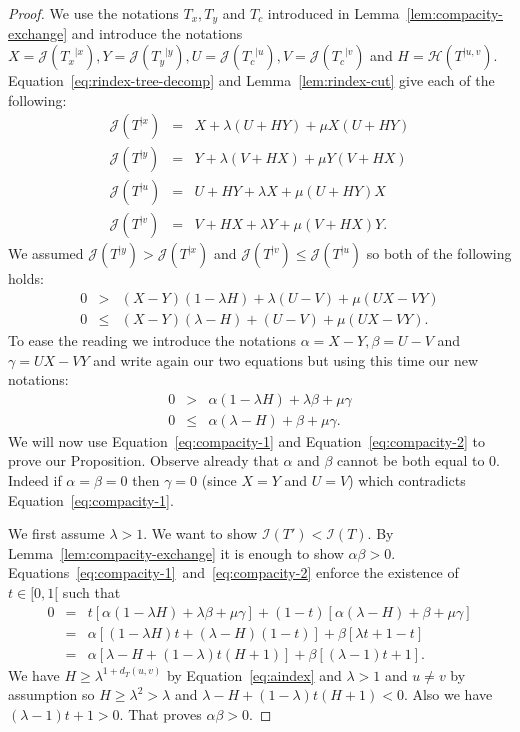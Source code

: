 \documentclass[11 pt]{modarticle}
\newcommand{\distance}[3]{d_{#3}(#1,#2)}
\newcommand{\rtree}[2]{{#1}^{\lvert #2}}
\newcommand{\indexsymbol}{\mathcal{I}}
\newcommand{\tindex}[1]{\indexsymbol(#1)}
\newcommand{\rindexsymbol}{\mathcal{J}}
\newcommand{\rindex}[2]{\rindexsymbol(\rtree{#2}{#1})}
\newcommand{\aindexsymbol}{\mathcal{H}}
\newcommand{\aindex}[3]{\aindexsymbol(\rtree{#3}{#1, #2})}
\begin{document}
\begin{proof}
We use the notations $T_x, T_y$ and $T_c$ introduced in Lemma~\ref{lem:compacity-exchange} and introduce the notations $X = \rindex{x}{T_x}, Y = \rindex{y}{T_y}, U = \rindex{u}{T_c}, V = \rindex{v}{T_c}$ and $H = \aindex{u}{v}{T}$. Equation~\eqref{eq:rindex-tree-decomp} and Lemma~\ref{lem:rindex-cut} give each of the following:
\begin{eqnarray*}
	\rindex{x}{T} & = & X + \lambda (U + HY) + \mu X (U + HY) \\
	\rindex{y}{T} & = & Y + \lambda (V + HX) + \mu Y (V + HX) \\
	\rindex{u}{T} & = & U + HY + \lambda X + \mu (U + HY) X \\
	\rindex{v}{T} & = & V + HX + \lambda Y + \mu (V + HX) Y.
\end{eqnarray*}
We assumed $\rindex{y}{T} > \rindex{x}{T}$ and $\rindex{v}{T} \leq \rindex{u}{T}$ so both of the following holds:
\begin{eqnarray*}
	0 & > & (X - Y)(1 - \lambda H) + \lambda (U - V) + \mu (UX - VY) \\
	0 & \leq & (X - Y)(\lambda - H) + (U - V) + \mu (UX - VY).
\end{eqnarray*}
To ease the reading we introduce the notations $\alpha = X - Y, \beta = U - V$ and $\gamma = UX - VY$ and write again our two equations but using this time our new notations:
\begin{eqnarray}
	0 & > & \alpha (1 - \lambda H) + \lambda \beta + \mu \gamma \label{eq:compacity-1} \\
	0 & \leq & \alpha(\lambda - H) + \beta + \mu \gamma. \label{eq:compacity-2}
\end{eqnarray}
We will now use Equation~\eqref{eq:compacity-1} and Equation~\eqref{eq:compacity-2} to prove our Proposition. Observe already that $\alpha$ and $\beta$ cannot be both equal to $0$. Indeed if $\alpha = \beta = 0$ then $\gamma = 0$ (since $X = Y$ and $U = V$) which contradicts Equation~\eqref{eq:compacity-1}.


We first assume $\lambda > 1$. We want to show $\tindex{T'} < \tindex{T}$. By Lemma~\ref{lem:compacity-exchange} it is enough to show $\alpha \beta > 0$.  Equations~\eqref{eq:compacity-1}~and~\eqref{eq:compacity-2} enforce the existence of $t \in [0,1[$ such that
\begin{eqnarray*}
	0 & = & t [\alpha (1 - \lambda H) + \lambda \beta + \mu \gamma] + (1 - t) [\alpha(\lambda - H) + \beta + \mu \gamma] \\
	& = & \alpha [(1 - \lambda H)t + (\lambda - H)(1 - t)] + \beta [\lambda t + 1 - t] \\
	& = & \alpha [\lambda - H + (1 - \lambda)t(H+1)] + \beta [(\lambda - 1) t + 1].
\end{eqnarray*}
We have $H \geq \lambda^{1 + \distance{u}{v}{T}}$ by Equation~\eqref{eq:aindex} and $\lambda > 1$ and $u \neq v$ by assumption so $H \geq \lambda^2 > \lambda$ and $\lambda - H + (1 - \lambda)t(H+1) < 0$.  Also we have $(\lambda - 1) t + 1 > 0$. That proves $\alpha \beta > 0$.


\end{proof}
\end{document}
